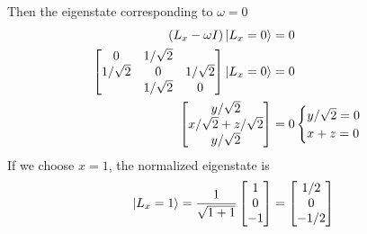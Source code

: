 \documentclass[../../../main.tex]{subfiles}
\begin{document}
Then the eigenstate corresponding to $\omega=0$
\begin{align*}
    \left( L_x -\omega I  \right) \ket{L_x=0} & = 0 \\
    \begin{bmatrix}
        0          & 1/\sqrt{2 } &            \\
        1/\sqrt{2} & 0           & 1/\sqrt{2} \\
                   & 1/\sqrt{2}  & 0          \\
    \end{bmatrix}
    \ket{L_x=0}                               & = 0 \\
    \begin{bmatrix}
        y/\sqrt{2}              \\
        x/\sqrt{2 }+z/\sqrt{2 } \\
        y/\sqrt{2}
    \end{bmatrix}
                                              & = 0
    \begin{cases}
        y/\sqrt{2}=0 \\
        x+z=0
    \end{cases}
\end{align*}
If we choose $x=1$, the normalized eigenstate is
\begin{equation*}
    \ket{L_x=1}=
    \frac{1}{\sqrt{1+1}}
    \begin{bmatrix}
        1  \\
        0  \\
        -1 \\
    \end{bmatrix}
    =
    \begin{bmatrix}
        1/2  \\
        0    \\
        -1/2 \\
    \end{bmatrix}
\end{equation*}
\end{document}

